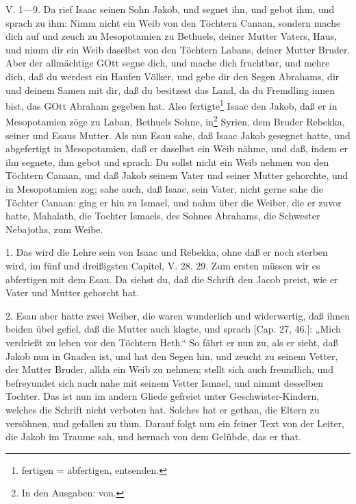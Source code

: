 \begin{schriftzitat}
V. 1—9. Da rief Isaac seinen Sohn Jakob, und segnet ihn, und gebot ihm, und sprach zu ihm: Nimm nicht ein Weib von den Töchtern Canaan, sondern mache dich auf und zeuch zu Mesopotamien zu Bethuels, deiner Mutter Vaters, Haus, und nimm dir ein Weib daselbst von den Töchtern Labans, deiner Mutter Bruder. Aber der allmächtige GOtt segne dich, und mache dich fruchtbar, und mehre dich, daß du werdest ein Haufen Völker, und gebe dir den Segen Abrahams, dir und deinem Samen mit dir, daß du besitzest das Land, da du Fremdling innen bist, das GOtt Abraham gegeben hat. Also fertigte\footnote{fertigen = abfertigen, entsenden.} Isaac den Jakob, daß er in Mesopotamien zöge zu Laban, Bethuels Sohne, in\footnote{In den Ausgaben: von.} Syrien, dem Bruder Rebekka, seiner und Esaus Mutter. Als nun Esau sahe, daß Isaac Jakob gesegnet hatte, und abgefertigt in Mesopotamien, daß er daselbst ein Weib nähme, und daß, indem er ihn segnete, ihm gebot und sprach: Du sollst nicht ein Weib nehmen von den Töchtern Canaan, und daß Jakob seinem Vater und seiner Mutter gehorchte, und in Mesopotamien zog; sahe auch, daß Isaac, sein Vater, nicht gerne sahe die Töchter Canaan: ging er hin zu Ismael, und nahm über die Weiber, die er zuvor hatte, Mahalath, die Tochter Ismaels, des Sohnes Abrahams, die Schwester Nebajoths, zum Weibe.
\end{schriftzitat}

1. Das wird die Lehre sein von Isaac und Rebekka, ohne daß er noch sterben wird, im fünf und dreißigsten Capitel, V. 28. 29. Zum ersten müssen wir es abfertigen mit dem Esau. Da siehst du, daß die Schrift den Jacob preist, wie er Vater und Mutter gehorcht hat.

2. Esau aber hatte zwei Weiber, die waren wunderlich und widerwertig, daß ihnen beiden übel gefiel, daß die Mutter auch klagte, und sprach [Cap. 27, 46.]: „Mich verdrießt zu leben vor den Töchtern Heth.“ So fährt er nun zu, als er sieht, daß Jakob nun in Gnaden ist, und hat den Segen hin, und zeucht zu seinem Vetter, der Mutter Bruder, allda ein Weib zu nehmen; stellt sich auch freundlich, und befreyundet sich auch nahe mit seinem Vetter Ismael, und nimmt desselben Tochter. Das ist nun im andern Gliede gefreiet unter Geschwister-Kindern, welches die Schrift nicht verboten hat. Solches hat er gethan, die Eltern zu versöhnen, und gefallen zu thun. Darauf folgt nun ein feiner Text von der Leiter, die Jakob im Traume sah, und hernach von dem Gelübde, das er that.

